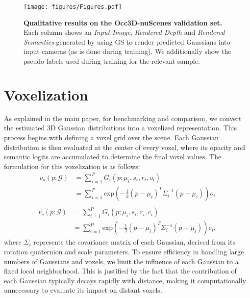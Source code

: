 \begin{figure*}[t]
  \centering
      \texttt{[image: figures/Figures.pdf]}
  \caption{
  \textbf{Qualitative results on the Occ3D-nuScenes validation set.}
  Each column shows an \textit{Input Image}, \textit{Rendered Depth} and \textit{Rendered Semantics} generated by using GS to render predicted Gaussians into input cameras (as is done during training).
  We additionally show the pseudo labels used during training for the relevant sample.}
\label{fig:qual_render}
\end{figure*}

\section{Voxelization}
\noindent
As explained in the main paper, for benchmarking and comparison, we convert the estimated 3D Gaussian distributions into a voxelized representation.
This process begins with defining a voxel grid over the scene.
Each Gaussian distribution is then evaluated at the center of every voxel, where its opacity and semantic logits are accumulated to determine the final voxel values.
The formulation for this voxelization is as follows:
\begin{equation}
    \begin{aligned}
        v_o(p; \mathcal{G}) & = \sum_{i=1}^PG_i(p; \mu_i, s_i, r_i,o_i) \\
        & =  \sum_{i=1}^P \text{exp}\left(- \frac{1}{2}\left( p -\mu_i \right)^T \Sigma^{-1}_i \left( p-\mu_i \right) \right) o_i \\
        \end{aligned}
        \end{equation}
        \begin{equation}
        \begin{aligned}
        v_c(p; \mathcal{G}) & =  \sum_{i=1}^PG_i(p; \mu_i, s_i, r_i,c_i) \\ 
        & = \sum_{i=1}^P \text{exp}\left(- \frac{1}{2}\left( p -\mu_i \right)^T \Sigma^{-1}_i \left( p-\mu_i \right) \right) c_i  ,
    \end{aligned}
\end{equation}
where $\Sigma_i$ represents the covariance matrix of each Gaussian, derived from its rotation quaternion and scale parameters.
To ensure efficiency in handling large numbers of Gaussians and voxels, we limit the influence of each Gaussian to a fixed local neighborhood.
This is justified by the fact that the contribution of each Gaussian typically decays rapidly with distance, making it computationally unnecessary to evaluate its impact on distant voxels.
